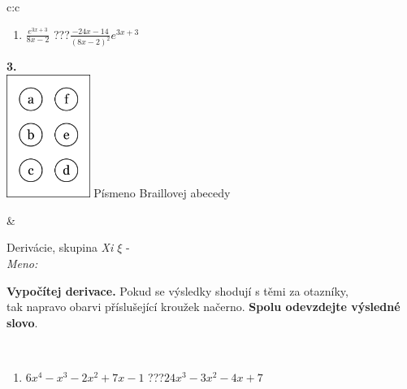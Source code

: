 \documentclass[10pt]{report}
\begin{document}
\begin{tabular}{c:c}
\begin{minipage}[c][104.5mm][t]{0.5\linewidth}
\begin{center}
\begin{minipage}{0.79\linewidth}
\begin{center}
\begin{varwidth}{\linewidth}
\begin{enumerate}
\item $\frac{e^{3x+3}}{8x-2}$\quad \dotfill\; ???\;\dotfill \quad $\frac{-24x-14}{(8x-2)^2}e^{3x+3}$
\end{enumerate}
\end{varwidth}
\end{center}
\end{minipage}
\begin{minipage}{0.20\linewidth}
\begin{center}
{\Huge\bfseries 3.} \\[2mm]
\includegraphics[height=40mm]{../images/braille.png}
{\small Písmeno Braillovej abecedy}
\end{center}
\end{minipage}
\end{center}
\end{minipage}
&
\begin{minipage}[c][104.5mm][t]{0.5\linewidth}
\begin{center}
\vspace{7mm}
{\huge Derivácie, skupina \textit{Xi $\xi$} -}\\[5mm]
\textit{Meno:}\phantom{xxxxxxxxxxxxxxxxxxxxxxxxxxxxxxxxxxxxxxxxxxxxxxxxxxxxxxxxxxxxxxxxx}\\[5mm]
\begin{minipage}{0.95\linewidth}
\begin{center}
\textbf{Vypočítej derivace.} Pokud se výsledky shodují s těmi za otazníky,\\tak napravo obarvi příslušející kroužek načerno. \textbf{Spolu odevzdejte výsledné slovo}.
\end{center}
\end{minipage}
\\[1mm]
\begin{minipage}{0.79\linewidth}
\begin{center}
\begin{varwidth}{\linewidth}
\begin{enumerate}
\normalsize
\item $6x^4-x^3-2x^2+7x-1$\quad \dotfill\; ???\;\dotfill \quad $24x^3-3x^2-4x+7$

\end{enumerate}
\end{varwidth}
\end{center}
\end{minipage}
\end{center}
\end{minipage}
\end{tabular}
\end{document}
